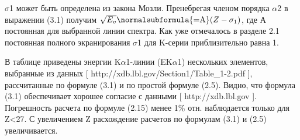 \documentclass[a4paper,14pt, openany, twoside, draft]{extbook} %
\begin{document}
${\sigma}$1 может быть определена из закона Мозли. Пренебрегая членом порядка ${\alpha}$2 в выражении (3.1) получим  $\sqrt{E_v}\normalsubformula{\text{=A}}(Z-\sigma _1)$, где А постоянная для выбранной линии спектра. Как уже отмечалось в разделе 2.1 постоянная полного экранирования ${\sigma}$1  для K{}-серии приблизительно равна 1.

В таблице приведены энергии K${\alpha}$1{}-линии (EK${\alpha}$1) нескольких элементов, выбранные из данных [ http://xdb.lbl.gov/Section1/Table\_1-2.pdf ], рассчитанные по формуле (3.1) и по простой формуле (2.5). Видно, что формула (3.1) обеспечивает хорошее согласие с данными  [ http://xdb.lbl.gov ]. Погрешность расчета по формуле (2.15) менее 1\% отн. наблюдается только для Z{\textless}27. С увеличением Z расхождение расчетов по формулам (3.1) и (2.5) увеличивается.
\end{document}
